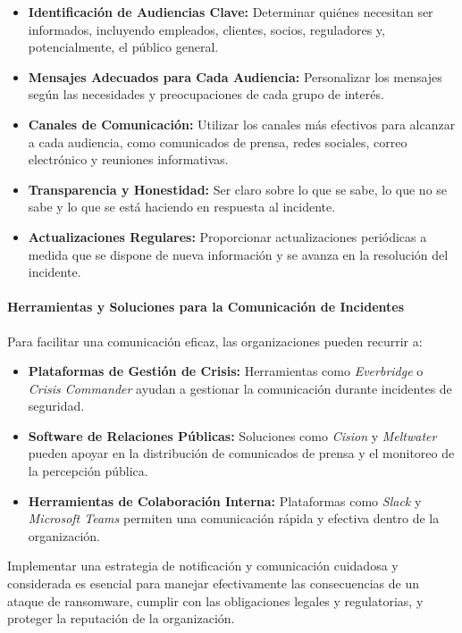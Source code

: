 \begin{itemize}
    \item \textbf{Identificación de Audiencias Clave:} Determinar quiénes necesitan ser informados, incluyendo empleados, clientes, socios, reguladores y, potencialmente, el público general.
    \item \textbf{Mensajes Adecuados para Cada Audiencia:} Personalizar los mensajes según las necesidades y preocupaciones de cada grupo de interés.
    \item \textbf{Canales de Comunicación:} Utilizar los canales más efectivos para alcanzar a cada audiencia, como comunicados de prensa, redes sociales, correo electrónico y reuniones informativas.
    \item \textbf{Transparencia y Honestidad:} Ser claro sobre lo que se sabe, lo que no se sabe y lo que se está haciendo en respuesta al incidente.
    \item \textbf{Actualizaciones Regulares:} Proporcionar actualizaciones periódicas a medida que se dispone de nueva información y se avanza en la resolución del incidente.
\end{itemize}

\paragraph{Herramientas y Soluciones para la Comunicación de Incidentes}

Para facilitar una comunicación eficaz, las organizaciones pueden recurrir a:

\begin{itemize}
    \item \textbf{Plataformas de Gestión de Crisis:} Herramientas como \textit{Everbridge} o \textit{Crisis Commander} ayudan a gestionar la comunicación durante incidentes de seguridad.
    \item \textbf{Software de Relaciones Públicas:} Soluciones como \textit{Cision} y \textit{Meltwater} pueden apoyar en la distribución de comunicados de prensa y el monitoreo de la percepción pública.
    \item \textbf{Herramientas de Colaboración Interna:} Plataformas como \textit{Slack} y \textit{Microsoft Teams} permiten una comunicación rápida y efectiva dentro de la organización.
\end{itemize}

Implementar una estrategia de notificación y comunicación cuidadosa y considerada es esencial para manejar efectivamente las consecuencias de un ataque de ransomware, cumplir con las obligaciones legales y regulatorias, y proteger la reputación de la organización.
